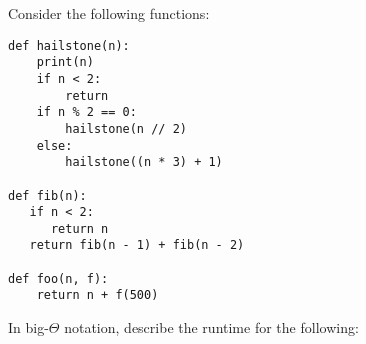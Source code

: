 \begin{blocksection}
\question Consider the following functions: 
\begin{lstlisting}
def hailstone(n):
    print(n)
    if n < 2:
        return
    if n % 2 == 0:
        hailstone(n // 2)
    else:
        hailstone((n * 3) + 1)

def fib(n):
   if n < 2:
      return n
   return fib(n - 1) + fib(n - 2)

def foo(n, f):
    return n + f(500)
\end{lstlisting}
In big-$\Theta$ notation, describe the runtime for the following:

\end{blocksection}
